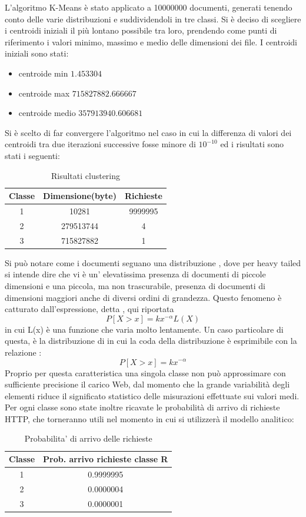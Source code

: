 L'algoritmo K-Means è stato applicato a 10000000 documenti, generati tenendo conto delle varie distribuzioni e suddividendoli in tre classi. Si è deciso di scegliere i centroidi iniziali il più lontano possibile tra loro, prendendo come punti di riferimento i valori minimo, massimo e medio delle dimensioni dei file. I centroidi iniziali sono stati:
\begin{itemize}
\item centroide min $1.453304$
\item centroide max $715827882.666667 $
\item centroide medio $357913940.606681 $
\end{itemize}
Si è scelto di far convergere l'algoritmo nel caso in cui la differenza di valori dei centroidi tra due iterazioni successive fosse minore di $10^{-10}$ ed i risultati sono stati i seguenti: 
\begin{table}[htbp]
\begin{center}
\begin{tabular}{||c|c|c||}
\hline
Classe	&Dimensione(byte)		&Richieste \\ 
\hline\hline
1 &10281 &9999995\\ \hline
2 &279513744 &4 \\ \hline
3 &715827882 &1 \\ \hline
\end{tabular}
\end{center}
\caption{Risultati clustering}
\label{risclustering}
\end{table}
Si può notare come i documenti seguano una distribuzione , dove per heavy tailed si intende dire che vi è un' elevatissima presenza di documenti di piccole dimensioni e una piccola, ma non trascurabile, presenza di documenti di dimensioni maggiori anche di diversi ordini di grandezza. Questo fenomeno è catturato dall'espressione, detta , qui riportata 
$$P[X > x] = kx^{-\alpha}L(X)$$
in cui L(x) è una funzione che varia molto lentamente. 
Un caso particolare di questa, è la distribuzione di  in cui la coda della distribuzione è esprimibile con la relazione :
$$P[X > x] = kx^{-\alpha}$$
Proprio per questa caratteristica una singola classe non può approssimare con sufficiente precisione il carico Web, dal momento che la grande variabilità degli elementi riduce il significato statistico delle misurazioni effettuate sui valori medi. 
Per ogni classe sono state inoltre ricavate le probabilità di arrivo di richieste HTTP, che torneranno utili nel momento in cui si utilizzerà il modello analitico: 
\begin{table}[H]
\begin{center}
\begin{tabular}{||c|c||}
\hline
Classe		&Prob. arrivo richieste classe R	\\
\hline
\hline
1		&0.9999995	\\
\hline
2		&0.0000004\\
\hline
3		&0.0000001\\
\hline
\end{tabular}
\end{center}
\caption{Probabilita' di arrivo delle richieste}
\label{test_2}
\end{table}
